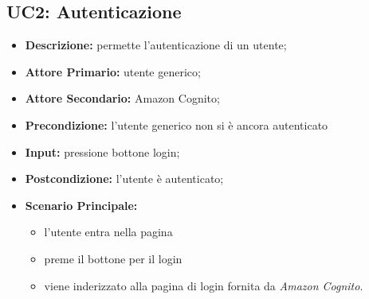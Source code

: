 \subsection{UC2: Autenticazione}
        \label{sec:UC2}
        \begin{itemize}
            \item \textbf{Descrizione:} permette l'autenticazione di un utente;
            \item \textbf{Attore Primario:} utente generico;
            \item \textbf{Attore Secondario:} Amazon Cognito;
            \item \textbf{Precondizione:} l'utente generico non si è ancora autenticato
            \item \textbf{Input:} pressione bottone login;
            \item \textbf{Postcondizione:} l'utente è autenticato;
            \item \textbf{Scenario Principale:} 
            \begin{itemize}
                \item l'utente entra nella pagina
                \item preme il bottone per il login
                \item viene inderizzato alla pagina di login fornita da \textit{Amazon Cognito}.
            \end{itemize}
        \end{itemize}